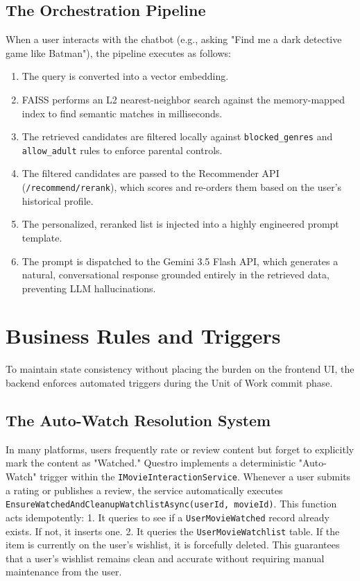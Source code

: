\subsection{The Orchestration Pipeline}
When a user interacts with the chatbot (e.g., asking "Find me a dark detective game like Batman"), the pipeline executes as follows:
\begin{enumerate}
    \item The query is converted into a vector embedding.
    \item FAISS performs an L2 nearest-neighbor search against the memory-mapped index to find semantic matches in milliseconds.
    \item The retrieved candidates are filtered locally against \texttt{blocked\_genres} and \texttt{allow\_adult} rules to enforce parental controls.
    \item The filtered candidates are passed to the Recommender API (\texttt{/recommend/\allowbreak rerank}), which scores and re-orders them based on the user's historical profile.
    \item The personalized, reranked list is injected into a highly engineered prompt template.
    \item The prompt is dispatched to the Gemini 3.5 Flash API, which generates a natural, conversational response grounded entirely in the retrieved data, preventing LLM hallucinations.
\end{enumerate}

\section{Business Rules and Triggers}
To maintain state consistency without placing the burden on the frontend UI, the backend enforces automated triggers during the Unit of Work commit phase.

\subsection{The Auto-Watch Resolution System}
In many platforms, users frequently rate or review content but forget to explicitly mark the content as "Watched." Questro implements a deterministic "Auto-Watch" trigger within the \texttt{IMovieInteractionService}.
Whenever a user submits a rating or publishes a review, the service automatically executes \texttt{EnsureWatchedAndCleanupWatchlistAsync(userId, movieId)}. 
This function acts idempotently:
1. It queries to see if a \texttt{UserMovieWatched} record already exists. If not, it inserts one.
2. It queries the \texttt{UserMovieWatchlist} table. If the item is currently on the user's wishlist, it is forcefully deleted. 
This guarantees that a user's wishlist remains clean and accurate without requiring manual maintenance from the user.

